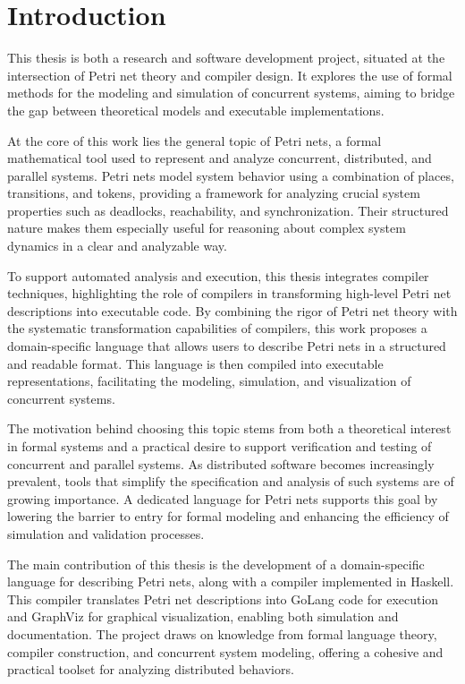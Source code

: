 \documentclass[12pt]{article}
\begin{document}
\section{Introduction}
This thesis is both a research and software development project, situated at the intersection of Petri net theory and compiler design. It explores the use of formal methods for the modeling and simulation of concurrent systems, aiming to bridge the gap between theoretical models and executable implementations.

At the core of this work lies the general topic of Petri nets, a formal mathematical tool used to represent and analyze concurrent, distributed, and parallel systems. Petri nets model system behavior using a combination of places, transitions, and tokens, providing a framework for analyzing crucial system properties such as deadlocks, reachability, and synchronization. Their structured nature makes them especially useful for reasoning about complex system dynamics in a clear and analyzable way.

To support automated analysis and execution, this thesis integrates compiler techniques, highlighting the role of compilers in transforming high-level Petri net descriptions into executable code. By combining the rigor of Petri net theory with the systematic transformation capabilities of compilers, this work proposes a domain-specific language that allows users to describe Petri nets in a structured and readable format. This language is then compiled into executable representations, facilitating the modeling, simulation, and visualization of concurrent systems.

The motivation behind choosing this topic stems from both a theoretical interest in formal systems and a practical desire to support verification and testing of concurrent and parallel systems. As distributed software becomes increasingly prevalent, tools that simplify the specification and analysis of such systems are of growing importance. A dedicated language for Petri nets supports this goal by lowering the barrier to entry for formal modeling and enhancing the efficiency of simulation and validation processes.

The main contribution of this thesis is the development of a domain-specific language for describing Petri nets, along with a compiler implemented in Haskell. This compiler translates Petri net descriptions into GoLang code for execution and GraphViz for graphical visualization, enabling both simulation and documentation. The project draws on knowledge from formal language theory, compiler construction, and concurrent system modeling, offering a cohesive and practical toolset for analyzing distributed behaviors.
\end{document}
